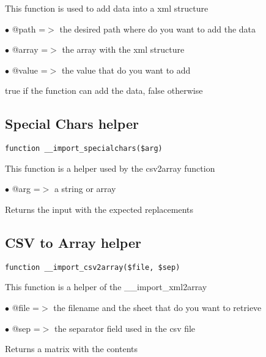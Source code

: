 \documentclass[a4paper]{book}
\begin{document}
This function is used to add data into a xml structure

\begin{compactitem}
\item[\color{myblue}$\bullet$] @path  =$>$ the desired path where do you want to add the data
\item[\color{myblue}$\bullet$] @array =$>$ the array with the xml structure
\item[\color{myblue}$\bullet$] @value =$>$ the value that do you want to add
\end{compactitem}

true if the function can add the data, false otherwise

\hypertarget{toc164}{}
\subsection{Special Chars helper}

\begin{lstlisting}
function __import_specialchars($arg)
\end{lstlisting}

This function is a helper used by the csv2array function

\begin{compactitem}
\item[\color{myblue}$\bullet$] @arg =$>$ a string or array
\end{compactitem}

Returns the input with the expected replacements

\hypertarget{toc165}{}
\subsection{CSV to Array helper}

\begin{lstlisting}
function __import_csv2array($file, $sep)
\end{lstlisting}

This function is a helper of the \_\_import\_xml2array

\begin{compactitem}
\item[\color{myblue}$\bullet$] @file =$>$ the filename and the sheet that do you want to retrieve
\item[\color{myblue}$\bullet$] @sep  =$>$ the separator field used in the csv file
\end{compactitem}

Returns a matrix with the contents
\end{document}
